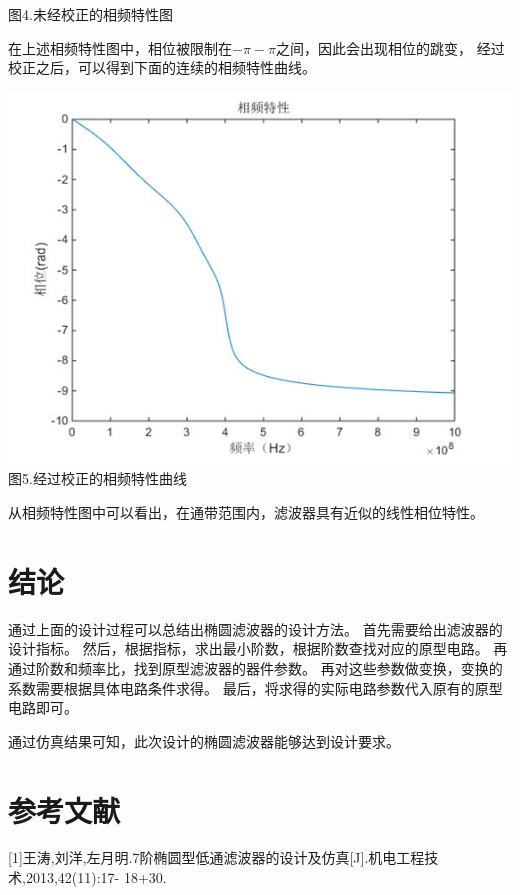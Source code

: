\documentclass{article}
\begin{document}
\begin{CJK}{UTF8}{gbsn}
\begin{center}
图4.未经校正的相频特性图
\end{center}

在上述相频特性图中，相位被限制在\(-\pi-\pi\)之间，因此会出现相位的跳变，
经过校正之后，可以得到下面的连续的相频特性曲线。


\begin{center}
\includegraphics[scale=0.5]{phase}
图5.经过校正的相频特性曲线
\end{center}

从相频特性图中可以看出，在通带范围内，滤波器具有近似的线性相位特性。


\section{结论}

通过上面的设计过程可以总结出椭圆滤波器的设计方法。
首先需要给出滤波器的设计指标。
然后，根据指标，求出最小阶数，根据阶数查找对应的原型电路。
再通过阶数和频率比，找到原型滤波器的器件参数。
再对这些参数做变换，变换的系数需要根据具体电路条件求得。
最后，将求得的实际电路参数代入原有的原型电路即可。

通过仿真结果可知，此次设计的椭圆滤波器能够达到设计要求。

\section{参考文献}

[1]王涛,刘洋,左月明.7阶椭圆型低通滤波器的设计及仿真[J].机电工程技术,2013,42(11):17-
18+30.

\end{CJK}
\end{document}
